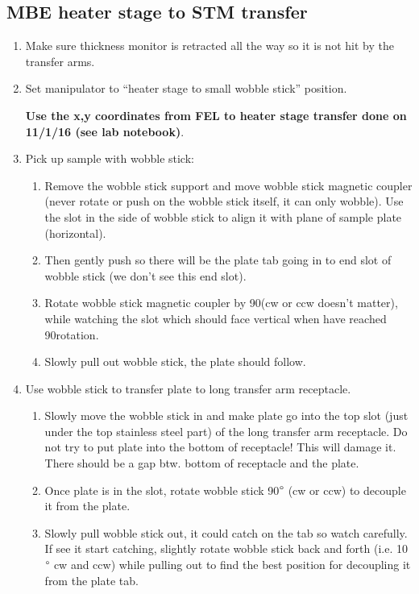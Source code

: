 \subsection{MBE heater stage to STM transfer}
\begin{enumerate}
	\item	Make sure thickness monitor is retracted all the way so it is not hit by the transfer arms.
     \item Set manipulator to “heater stage to small wobble stick” position.

	\textbf{Use the x,y coordinates from FEL to heater stage transfer done on 11/1/16 (see lab notebook)}.
	\item	Pick up sample with wobble stick: 
	\begin{enumerate}
	\item	Remove the wobble stick support and move wobble stick magnetic coupler (never rotate or push on the wobble stick itself, it can only wobble).  Use the slot in the side of wobble stick to align it with plane of sample plate (horizontal). 
	\item	Then gently push so there will be the plate tab going in to end slot of wobble stick (we don’t see this end slot). 
	\item	Rotate wobble stick magnetic coupler by 90\degree (cw or ccw doesn’t matter), while watching the slot which should face vertical when have reached 90\degree rotation.
	\item	Slowly pull out wobble stick, the plate should follow.
	\end{enumerate}
\item	Use wobble stick to transfer plate to long transfer arm receptacle. 
\begin{enumerate}
	\item	Slowly move the wobble stick in and make plate go into the top slot (just under the top stainless steel part) of the long transfer arm receptacle. Do not try to put plate into the bottom of receptacle! This will damage it. There should be a gap btw. bottom of receptacle and the plate. 
	\item	Once plate is in the slot, rotate wobble stick 90$\degree$ (cw or ccw) to decouple it from the plate. 
	\item	Slowly pull wobble stick out, it could catch on the tab so watch carefully. If see it start catching, slightly rotate wobble stick back and forth (i.e. 10$\degree$ cw and ccw) while pulling out to find the best position for decoupling it from the plate tab. 
\end{enumerate}

\end{enumerate}
